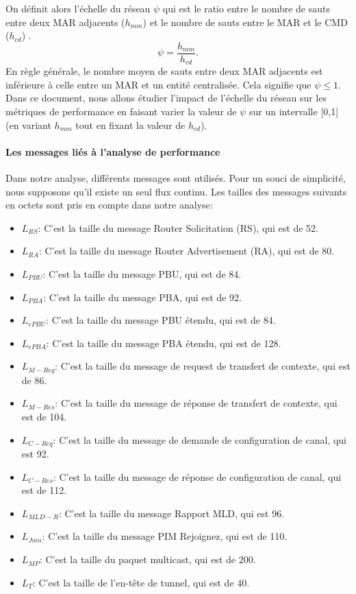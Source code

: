 On définit alors l'échelle du réseau $\psi$ qui est le ratio entre le nombre de sauts entre deux MAR adjacents ($h_{mm}$) et le nombre de sauts entre le MAR et le CMD ($h_{cd}$) . \\
\begin{equation}
\psi = \frac{h_{mm}}{h_{cd}}.
\end{equation} 
En règle générale, le nombre moyen de sauts entre deux MAR adjacents est inférieure à celle entre un MAR et un entité centralisée. Cela signifie que $ \psi \leq 1 $. Dans ce document, nous allons étudier l'impact de l'échelle du réseau sur les métriques de performance en faisant varier la valeur de $ \psi $ sur un intervalle [0,1] (en variant $h_{mm} $ tout en fixant la valeur de $ h_{cd} $).


\paragraph{Les messages liés à l'analyse de performance}
Dans notre analyse, différents messages sont utilisés. Pour un souci de simplicité, nous supposons qu'il existe un seul flux continu. Les tailles des messages suivants en octets sont pris en compte dans notre analyse:

\begin{itemize}
\item $L_{RS}$: C'est la taille du message Router Solicitation (RS), qui est de 52.
\item $L_{RA}$: C'est la taille du message Router Advertisement (RA), qui est de 80.
\item $L_{PBU}$: C'est la taille du message PBU, qui est de 84.
\item $L_{PBA}$: C'est la taille du message PBA, qui est de 92.
\item $L_{ePBU}$: C'est la taille du message PBU étendu, qui est de 84.
\item $L_{ePBA}$: C'est la taille du message PBA étendu, qui est de 128.
\item $L_{M-Req}$: C'est la taille du message de request de transfert de contexte, qui est de 86.
\item $L_{M-Res}$: C'est la taille du message de réponse de transfert de contexte, qui est de 104.
\item $L_{C-Req}$: C'est la taille du message de demande de configuration de canal, qui est 92.
\item $L_{C-Res}$: C'est la taille du message de réponse de configuration de canal, qui est de 112.
\item $L_{MLD-R}$: C'est la taille du message Rapport MLD, qui est 96.
\item $L_{Join}$: C'est la taille du message PIM Rejoignez, qui est de 110.
\item $L_{MP}$: C'est la taille du paquet multicast, qui est de 200.
\item $L_{T}$: C'est la taille de l'en-tête de tunnel, qui est de 40.
\end{itemize}

